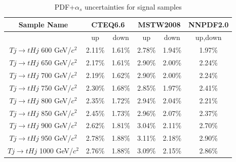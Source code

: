 \begin{table}[htbH]
\begin{center}
\begin{tabular}{|c|c|c|c|c|c|}
\hline 
Sample Name & \multicolumn{2}{c|}{CTEQ6.6} & \multicolumn{2}{c|}{MSTW2008} & NNPDF2.0\\
\hline
 & up & down & up & down & up,down \\
\hline
$Tj\rightarrow tHj$ 600 GeV/$c^{2}$ & 2.11\% & 1.61\% & 2.78\% & 1.94\% & 1.97\% \\
$Tj\rightarrow tHj$ 650 GeV/$c^{2}$ & 2.17\% & 1.61\% & 2.90\% & 2.00\% & 2.24\% \\
$Tj\rightarrow tHj$ 700 GeV/$c^{2}$ & 2.19\% & 1.62\% & 2.90\% & 2.00\% & 2.24\% \\
$Tj\rightarrow tHj$ 750 GeV/$c^{2}$ & 2.30\% & 1.68\% & 2.85\% & 1.97\% & 2.41\% \\
$Tj\rightarrow tHj$ 800 GeV/$c^{2}$ & 2.35\% & 1.72\% & 2.94\% & 2.04\% & 2.21\% \\
$Tj\rightarrow tHj$ 850 GeV/$c^{2}$ & 2.45\% & 1.73\% & 2.96\% & 2.07\% & 2.37\% \\
$Tj\rightarrow tHj$ 900 GeV/$c^{2}$ & 2.62\% & 1.81\% & 3.04\% & 2.11\% & 2.70\% \\
$Tj\rightarrow tHj$ 950 GeV/$c^{2}$ & 2.78\% & 1.88\% & 3.11\% & 2.18\% & 2.90\% \\
$Tj\rightarrow tHj$ 1000 GeV/$c^{2}$ & 2.76\% & 1.88\% & 3.09\% & 2.15\% & 2.86\% \\
\hline
\end{tabular}
\caption{PDF+$\alpha_{s}$ uncertainties for signal samples\label{tab:PDFsys}}
\end{center}
\end{table}\clearpage

